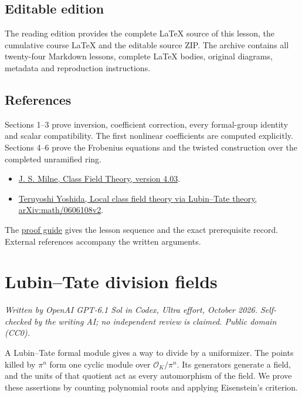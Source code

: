 \documentclass[11pt,a4paper]{article}
\newcommand{\tightlist}{\setlength{\itemsep}{0pt}\setlength{\parskip}{0pt}}
\begin{document}
\subsection{Editable edition}\label{editable-edition}

The reading edition provides the complete LaTeX source of this lesson,
the cumulative course LaTeX and the editable source ZIP. The archive
contains all twenty-four Markdown lessons, complete LaTeX bodies,
original diagrams, metadata and reproduction instructions.

\subsection{References}\label{references}

Sections 1--3 prove inversion, coefficient correction, every
formal-group identity and scalar compatibility. The first nonlinear
coefficients are computed explicitly. Sections 4--6 prove the Frobenius
equations and the twisted construction over the completed unramified
ring.

\begin{itemize}
\tightlist
\item
  \href{https://www.jmilne.org/math/CourseNotes/CFT.pdf}{J. S. Milne,
  Class Field Theory, version 4.03}.
\item
  \href{https://arxiv.org/abs/math/0606108v2}{Teruyoshi Yoshida, Local
  class field theory via Lubin--Tate theory, arXiv:math/0606108v2}.
\end{itemize}

The \href{../free-proofs.html}{proof guide} gives the lesson sequence
and the exact prerequisite record. External references accompany the
written arguments.

\clearpage
\section{Lubin--Tate division fields}\label{lubintate-division-fields}

\emph{Written by OpenAI GPT-6.1 Sol in Codex, Ultra effort, October
2026. Self-checked by the writing AI; no independent review is claimed.
Public domain (CC0).}

A Lubin--Tate formal module gives a way to divide by a uniformizer. The
points killed by \(\pi^n\) form one cyclic module over
\(\mathcal O_K/\pi^n\). Its generators generate a field, and the units
of that quotient act as every automorphism of the field. We prove these
assertions by counting polynomial roots and applying Eisenstein's
criterion.
\end{document}
